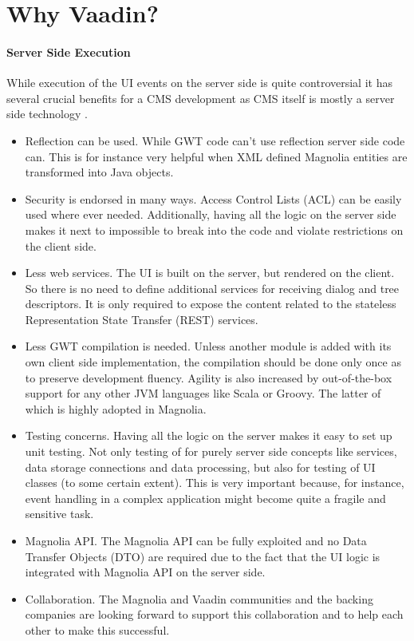 \section{Why Vaadin?}
\paragraph {Server Side Execution}
While execution of the UI events on the server side is quite controversial it
has several crucial benefits for a CMS development as CMS itself is mostly a
server side technology \cite{why_vaadin_philipp}.

\begin{itemize}
  \item Reflection can be used. While GWT code can't use reflection server side
  code can. This is for instance very helpful when 
  XML defined Magnolia entities are transformed into Java objects.

  \item Security is endorsed in many ways. Access Control Lists (ACL) can be
  easily used where ever needed. Additionally, having all the logic on the
  server side makes it next to impossible to break into the code and violate
  restrictions on the client side.

  \item Less web services. The UI is built on the server, but rendered on the
  client. So there is no need to define additional services for receiving dialog
  and tree descriptors. It is only required to expose the content related to the
  stateless Representation State Transfer (REST) services.

  \item Less GWT compilation is needed. Unless another module is added with its
  own client side implementation, the compilation should be done only once as to
  preserve development fluency. Agility is also increased by out-of-the-box
  support for any other JVM languages like Scala or Groovy. The latter of which
  is highly adopted in Magnolia.

  \item Testing concerns. Having all the logic on the server makes it easy to
  set up unit testing. Not only testing of for purely server side concepts like
  services, data storage connections and data processing, but also for testing
  of UI classes (to some certain extent). This is very important because, for
  instance, event handling in a complex application might become quite a fragile
  and sensitive task.
   
  \item Magnolia API. The Magnolia API can be fully exploited and no Data
  Transfer Objects (DTO) are required due to the fact that the UI logic is
  integrated with Magnolia API on the server side.

  \item Collaboration. The Magnolia and Vaadin communities and the backing
  companies are looking forward to support this collaboration and to help each
  other to make this successful.
  
\end{itemize}

